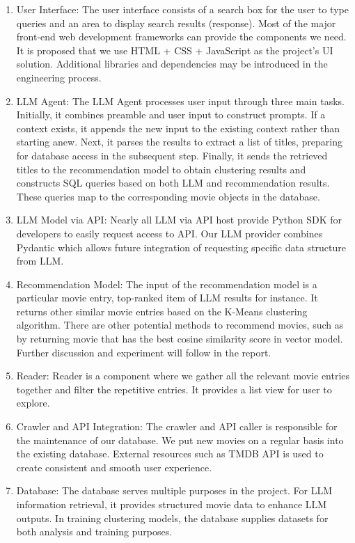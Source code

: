 \documentclass[journal]{IEEEtran}
\theoremstyle{mydefstyle}
\begin{document}
\begin{enumerate}
    \item  {User Interface}: The user interface consists of a search box for the user to type queries and an area to display search results (response). Most of the major front-end web development frameworks can provide the components we need. It is proposed that we use HTML + CSS + JavaScript as the project’s UI solution. Additional libraries and dependencies may be introduced in the engineering process.

    \item {LLM Agent}: The LLM Agent processes user input through three main tasks. Initially, it combines preamble and user input to construct prompts. If a context exists, it appends the new input to the existing context rather than starting anew. Next, it parses the results to extract a list of titles, preparing for database access in the subsequent step. Finally, it sends the retrieved titles to the recommendation model to obtain clustering results and constructs SQL queries based on both LLM and recommendation results. These queries map to the corresponding movie objects in the database.

    \item {LLM Model via API}: Nearly all LLM via API host provide Python SDK for developers to easily request access to API. Our LLM provider combines Pydantic which allows future integration of requesting specific data structure from LLM.

    \item {Recommendation Model}: The input of the recommendation model is a particular movie entry, top-ranked item of LLM results for instance. It returns other similar movie entries based on the K-Means clustering algorithm. There are other potential methods to recommend movies, such as by returning movie that has the best cosine similarity score in vector model. Further discussion and experiment will follow in the report.

    \item {Reader}: Reader is a component where we gather all the relevant movie entries together and filter the repetitive entries. It provides a list view for user to explore.

    \item {Crawler and API Integration}: The crawler and API caller is responsible for the maintenance of our database. We put new movies on a regular basis into the existing database. External resources such as TMDB API is used to create consistent and smooth user experience.

    \item {Database}: The database serves multiple purposes in the project. For LLM information retrieval, it provides structured movie data to enhance LLM outputs. In training clustering models, the database supplies datasets for both analysis and training purposes.
\end{enumerate}
\end{document}
